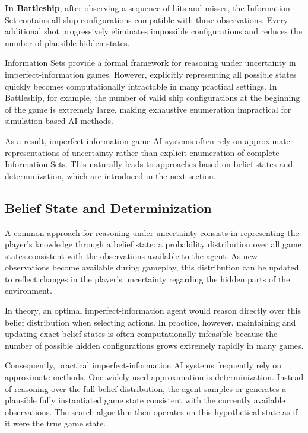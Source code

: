 \textbf{In Battleship}, after observing a sequence of hits and misses, the Information Set contains all ship configurations compatible with these observations. Every additional shot progressively eliminates impossible configurations and reduces the number of plausible hidden states.

\newpage

Information Sets provide a formal framework for reasoning under uncertainty in imperfect-information games. However, explicitly representing all possible states quickly becomes computationally intractable in many practical settings. In Battleship, for example, the number of valid ship configurations at the beginning of the game is extremely large, making exhaustive enumeration impractical for simulation-based AI methods.

As a result, imperfect-information game AI systems often rely on approximate representations of uncertainty rather than explicit enumeration of complete Information Sets. This naturally leads to approaches based on belief states and determinization, which are introduced in the next section.

\subsection{Belief State and Determinization}
A common approach for reasoning under uncertainty consists in representing the player’s knowledge through a belief state: a probability distribution over all game states consistent with the observations available to the agent\cite{kaelbling1998planning}. As new observations become available during gameplay, this distribution can be updated to reflect changes in the player’s uncertainty regarding the hidden parts of the environment.

In theory, an optimal imperfect-information agent would reason directly over this belief distribution when selecting actions. In practice, however, maintaining and updating exact belief states is often computationally infeasible because the number of possible hidden configurations grows extremely rapidly in many games.

Consequently, practical imperfect-information AI systems frequently rely on approximate methods. One widely used approximation is determinization\cite{long2010understanding,cowling2012information}. Instead of reasoning over the full belief distribution, the agent samples or generates a plausible fully instantiated game state consistent with the currently available observations. The search algorithm then operates on this hypothetical state as if it were the true game state.

